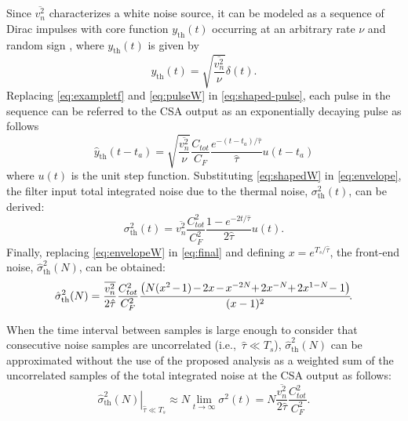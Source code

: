 Since $\overline{v_n^2}$ characterizes a white noise source, it can be modeled as a sequence of Dirac impulses with core function $y_\text{th}(t)$ occurring at an arbitrary rate $\nu$ and random sign \citep{pullia102}, where $y_\text{th}(t)$ is given by
	\begin{equation} 
		y_\text{th}(t) = \sqrt{\frac{\overline{v_n^2}}{\nu}}\delta(t)\label{eq:pulseW}.
	\end{equation}
Replacing \eqref{eq:exampletf} and \eqref{eq:pulseW} in \eqref{eq:shaped-pulse}, each pulse in the sequence can be referred to the CSA output as an exponentially decaying pulse \citep{pullia102} as follows
	\begin{equation} 
		\hat{y}_\text{th}(t-t_a)  = \sqrt{\frac{\overline{v_n^2}}{\nu}}\frac{C_{tot}}{C_F} \frac{ e^{-(t-t_a)/\hat{\tau}}}{\hat{\tau}}u(t-t_{a}) \label{eq:shapedW}
	\end{equation}
where $u(t)$ is the unit step function. Substituting \eqref{eq:shapedW} in \eqref{eq:envelope}, the filter input total integrated noise due to the thermal noise, $\sigma_\text{th}^2(t)$, can be derived:
	\begin{equation} 
		\sigma_\text{th}^2(t) = \overline{v_n^2} \frac{C_{tot}^2}{C_F^2}  \frac{1-e^{-2t/\hat{\tau}}}{2\hat{\tau}}u(t). \label{eq:envelopeW}
	\end{equation}
Finally, replacing \eqref{eq:envelopeW} in \eqref{eq:final} and defining $x=e^{T_s/\hat{\tau}}$, the front-end noise, $\hat{\sigma}_\text{th}^2(N)$, can be obtained:
	\begin{equation}
	\hat{\sigma}_\text{th}^2(N)  = \frac{\overline{v_n^2}}{2\hat{\tau}}\frac{C_{tot}^2}{C_F^2}\frac{\left(N(x^2\hspace{-0.1em}-\hspace{-0.1em}1) \hspace{-0.1em}-		\hspace{-0.1em}2x\hspace{-0.1em}-\hspace{-0.1em}x^{-{2N}}\hspace{-0.25em}+\hspace{-0.1em}2x^{-{N}}\hspace{-0.25em}+\hspace{-0.1em}2x^{1-N}		\hspace{-0.2em}-1 \right)}{(x-1)^2}\hspace{-2pt}.   \label{eq:exFinal}
	\end{equation}
	
When the time interval between samples is large enough to consider that consecutive noise samples are uncorrelated \mbox{(i.e., $\hat{\tau} \ll T_s$),} $\hat{\sigma}_\text{th}^2(N)$ can be approximated without the use of the proposed analysis as a weighted sum of the uncorrelated samples of the total integrated noise at the CSA output as follows:
\begin{equation}
	\left. \hat{\sigma}_\text{th}^2(N)\right\rvert_{\hat{\tau}\ll T_s}  \approx  N \lim_{t\rightarrow \infty} \sigma^2(t) = N \frac{\overline{v_n^2}}{2\hat{\tau}}\frac{C_{tot}^2}{C_F^2}. \label{eq:aprox}
\end{equation}

